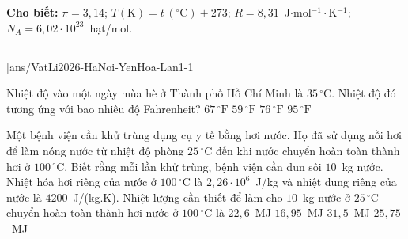 \def\CheDo{solcolor}%
\def\tenchuong{THPT Yên Hòa, Hà Nội -- Lần 1}
\def\thuonghieu{VẬT LÍ 12 -- Eduzy.com.vn}
\def\TachCauDS{1}
\def\TachCauLG{1}




	\noindent\textbf{Cho biết:} $\pi=3{,}14$; $T(\text{K})=t\,(^\circ\text{C})+273$; $R=8{,}31$~J$\cdot$mol$^{-1}\cdot$K$^{-1}$; $N_A=6{,}02\cdot 10^{23}$~hạt/mol.

	\noindent
	\subsection*{}
	\setcounter{ex}{0}
	[ans/VatLi2026-HaNoi-YenHoa-Lan1-1]

	\begin{ex}%
		Nhiệt độ vào một ngày mùa hè ở Thành phố Hồ Chí Minh là $35\,^\circ\text{C}$. Nhiệt độ đó tương ứng với bao nhiêu độ Fahrenheit?
		\choice
		{$67\,^\circ\text{F}$}
		{$59\,^\circ\text{F}$}
		{$76\,^\circ\text{F}$}
		{\True $95\,^\circ\text{F}$}
	\end{ex}

	\begin{ex}%
		Một bệnh viện cần khử trùng dụng cụ y tế bằng hơi nước. Họ đã sử dụng nồi hơi để làm nóng nước từ nhiệt độ phòng $25\,^\circ\text{C}$ đến khi nước chuyển hoàn toàn thành hơi ở $100\,^\circ\text{C}$. Biết rằng mỗi lần khử trùng, bệnh viện cần đun sôi $10$~kg nước. Nhiệt hóa hơi riêng của nước ở $100\,^\circ\text{C}$ là $2{,}26\cdot 10^6$~J/kg và nhiệt dung riêng của nước là $4200$~J/(kg.K). Nhiệt lượng cần thiết để làm cho $10$~kg nước ở $25\,^\circ\text{C}$ chuyển hoàn toàn thành hơi nước ở $100\,^\circ\text{C}$ là
		\choice
		{$22{,}6$~MJ}
		{$16{,}95$~MJ}
		{$31{,}5$~MJ}
		{\True $25{,}75$~MJ}
	\end{ex}

